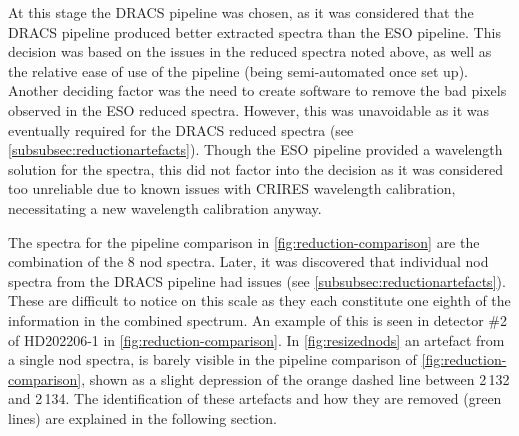 At this stage the {DRACS} pipeline was chosen, as it was considered that the {DRACS} pipeline produced better extracted spectra than the {ESO} pipeline.
This decision was based on the issues in the reduced spectra noted above, as well as the relative ease of use of the pipeline (being semi-automated once set up).
Another deciding factor was the need to create software to remove the bad pixels observed in the {ESO} reduced spectra.
However, this was unavoidable as it was eventually required for the {DRACS} reduced spectra (see \cref{subsubsec:reductionartefacts}).
Though the {ESO} pipeline provided a wavelength solution for the spectra, this did not factor into the decision as it was considered too unreliable due to known issues with {CRIRES} wavelength calibration, necessitating a new wavelength calibration anyway.

The spectra for the pipeline comparison in \cref{fig:reduction-comparison} are the combination of the 8 nod spectra.
Later, it was discovered that individual nod spectra from the {DRACS} pipeline had issues (see \cref{subsubsec:reductionartefacts}).
These are difficult to notice on this scale as they each constitute one eighth of the information in the combined spectrum.
An example of this is seen in detector \#2 of {HD202206-1} in \cref{fig:reduction-comparison}.
In \cref{fig:resizednods} an artefact from a single nod spectra, is barely visible in the pipeline comparison of \cref{fig:reduction-comparison}, shown as a slight depression of the orange dashed line between 2\,132 and 2\,134\nm{}.
The identification of these artefacts and how they are removed (green lines) are explained in the following section.

